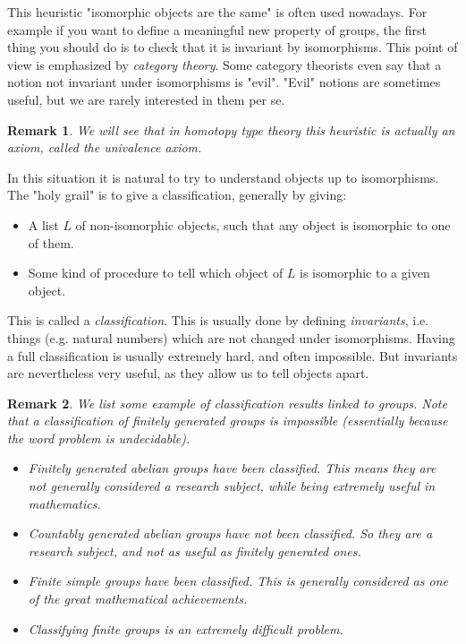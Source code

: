 \documentclass{article}
\newtheorem{remark}{Remark}
\begin{document}
This heuristic "isomorphic objects are the same" is often used nowadays. For example if you want to define a meaningful new property of groups, the first thing you should do is to check that it is invariant by isomorphisms. This point of view is emphasized by \emph{category theory}. Some category theorists even say that a notion not invariant under isomorphisms is "evil". "Evil" notions are sometimes useful, but we are rarely interested in them per se.

\begin{remark}
We will see that in homotopy type theory this heuristic is actually an axiom, called the \emph{univalence axiom}. 
\end{remark}



In this situation it is natural to try to understand objects up to isomorphisms. The "holy grail" is to give a classification, generally by giving:
\begin{itemize}
\item A list $L$ of non-isomorphic objects, such that any object is isomorphic to one of them.
\item Some kind of procedure to tell which object of $L$ is isomorphic to a given object. 
\end{itemize}

This is called a \emph{classification}. This is usually done by defining \emph{invariants}, i.e. things (e.g. natural numbers) which are not changed under isomorphisms. Having a full classification is usually extremely hard, and often impossible. But invariants are nevertheless very useful, as they allow us to tell objects apart.

\begin{remark}
We list some example of classification results linked to groups. Note that a classification of finitely generated groups is impossible (essentially because the word problem is undecidable).
\begin{itemize}
\item Finitely generated abelian groups have been classified. This means they are not generally considered a research subject, while being extremely useful in mathematics. 
\item Countably generated abelian groups have not been classified. So they are a research subject, and not as useful as finitely generated ones.%
\item Finite simple groups have been classified. This is generally considered as one of the great mathematical achievements.
\item Classifying finite groups is an extremely difficult problem.
\end{itemize}
\end{remark}
\end{document}
